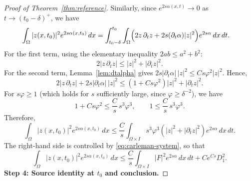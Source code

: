 \documentclass[10pt,a4paper]{amsart}
\newcommand{\Om}{\Omega}
\newcommand{\p}{\partial}
\begin{document}
\begin{proof}[Proof of Theorem~\ref{thm:reference}]
Similarly, since $e^{2s\alpha(x,t)}\to0$ as $t\to (t_0-\delta)^+$, we have
\begin{align}
\int_\Om |z(x,t_0)|^2 e^{2s\alpha(x,t_0)}\,dx
&=\int_{t_0-\delta}^{t_0}\int_\Om
\Bigl(2z\,\p_t z+2s(\p_t\alpha)|z|^2\Bigr)
e^{2s\alpha}\,dx\,dt.
\label{eq:z-identity}
\end{align}
For the first term, using the elementary inequality $2ab\le a^2+b^2$:
\[
2|z\,\p_t z|\le |z|^2+|\p_t z|^2.
\]
For the second term, Lemma~\ref{lem:dtalpha} gives
$2s|\p_t\alpha|\,|z|^2\le Cs\varphi^2|z|^2$.
Hence,
\[
2|z\,\p_t z|+2s|\p_t\alpha|\,|z|^2
\le (1+Cs\varphi^2)|z|^2+|\p_t z|^2.
\]
For $s\varphi\ge 1$ (which holds for $s$ sufficiently large, since
$\varphi\ge\delta^{-2}$), we have
\[
1+Cs\varphi^2\le \frac{C}{s}\,s^3\varphi^3,\qquad
1\le \frac{C}{s}\,s^3\varphi^3.
\]
Therefore,
\begin{equation}\label{eq:z-bound}
\int_\Om |z(x,t_0)|^2 e^{2s\alpha(x,t_0)}\,dx
\le \frac{C}{s}\int_{\Om\times I} s^3\varphi^3
\left(|z|^2+|\p_t z|^2\right)e^{2s\alpha}\,dx\,dt.
\end{equation}
The right-hand side is controlled by \eqref{eq:carleman-system}, so that
\begin{equation}\label{eq:z-final}
\int_\Om |z(x,t_0)|^2 e^{2s\alpha(x,t_0)}\,dx
\le \frac{C}{s}\int_{\Om\times I}|F|^2 e^{2s\alpha}\,dx\,dt
+ C e^{Cs} D_1^2.
\end{equation}
\medskip
\noindent\textbf{Step 4: Source identity at $t_0$ and conclusion.}


\end{proof}
\end{document}
